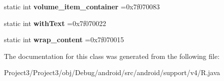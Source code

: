 \begin{DoxyCompactItemize}
static int {\bfseries volume\+\_\+item\+\_\+container} =0x7f070083
\item 
\mbox{\label{classandroid_1_1support_1_1v4_1_1R_1_1id_a14bf436b3a781f42aaad4d06b3f4248c}} 
static int {\bfseries with\+Text} =0x7f070022
\item 
\mbox{\label{classandroid_1_1support_1_1v4_1_1R_1_1id_ab14065f9877a0a74e3ac54e591fab49b}} 
static int {\bfseries wrap\+\_\+content} =0x7f070015
\end{DoxyCompactItemize}


The documentation for this class was generated from the following file\+:\begin{DoxyCompactItemize}
\item 
Project3/\+Project3/obj/\+Debug/android/src/android/support/v4/R.\+java\end{DoxyCompactItemize}
